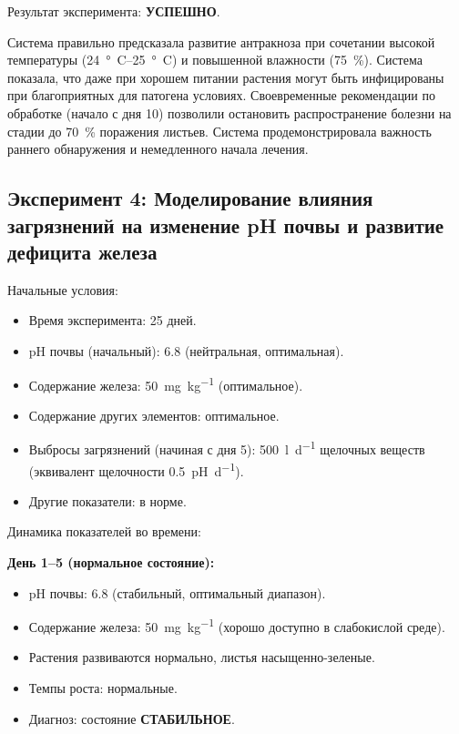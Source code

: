Результат эксперимента: \textbf{УСПЕШНО}.

Система правильно предсказала развитие антракноза при сочетании высокой температуры (\SIrange{24}{25}{\degree C}) и повышенной влажности (\SI{75}{\percent}). Система показала, что даже при хорошем питании растения могут быть инфицированы при благоприятных для патогена условиях. Своевременные рекомендации по обработке (начало с дня \num{10}) позволили остановить распространение болезни на стадии до \SI{70}{\percent} поражения листьев. Система продемонстрировала важность раннего обнаружения и немедленного начала лечения.

\subsection{Эксперимент 4: Моделирование влияния загрязнений на изменение pH почвы и развитие дефицита железа}

Начальные условия:
\begin{itemize}
    \item Время эксперимента: \num{25} дней.
    \item pH почвы (начальный): \num{6.8} (нейтральная, оптимальная).
    \item Содержание железа: \SI{50}{\milli\gram\per\kilogram} (оптимальное).
    \item Содержание других элементов: оптимальное.
    \item Выбросы загрязнений (начиная с дня \num{5}): \SI{500}{\litre\per\day} щелочных веществ (эквивалент щелочности \SI{0.5}{pH\per\day}).
    \item Другие показатели: в норме.
\end{itemize}

Динамика показателей во времени:

\textbf{День 1--5 (нормальное состояние):}
\begin{itemize}
    \item pH почвы: \num{6.8} (стабильный, оптимальный диапазон).
    \item Содержание железа: \SI{50}{\milli\gram\per\kilogram} (хорошо доступно в слабокислой среде).
    \item Растения развиваются нормально, листья насыщенно-зеленые.
    \item Темпы роста: нормальные.
    \item Диагноз: состояние \textbf{СТАБИЛЬНОЕ}.
\end{itemize}

